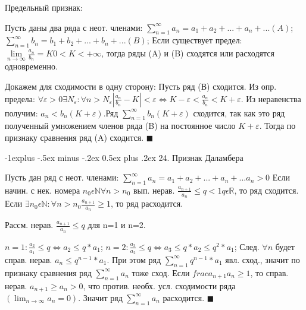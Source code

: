 \documentclass[unicode,10pt, landscape]{article}
\makeatletter
\renewcommand{\subsection}{\@startsection{subsection}{2}{0mm}%
                                {-1explus -.5ex minus -.2ex}%
                                {0.5ex plus .2ex}%
                                {\normalfont\normalsize\bfseries}}
\newenvironment{Proof} %
{\par\noindent{\bf Док-во:}} %
{\hfill$\scriptstyle\blacksquare$}
\makeatother
\begin{document}
\begin{multicols}{4}
Предельный признак:
\begin{Th}
Пусть даны два ряда с неот. членами: $\sum\limits_{n=1}^{\infty} a_{n}=a_{1}+a_{2}+...+a_{n}+...    (A)$; $\sum\limits_{n=1}^{\infty} b_{n}=b_{1}+b_{2}+...+b_{n}+...    (B)$; Если существует предел: $\lim\limits_{n\rightarrow \infty } \frac{a_{n}}{b_{n}}=K      0<K< +\infty$, тогда ряды (A) и (B) сходятся или расходятся одновременно.
\begin{Proof}
Докажем для сходимости в одну сторону:
Пусть ряд (В) сходится. Из опр. предела: $\forall \varepsilon >0 \exists N_{\varepsilon }:\forall n>N_{\varepsilon }\left | \frac{a_{n}}{b_{n}}-K \right |<\varepsilon \Leftrightarrow K-\varepsilon <\frac{a_{n}}{b_{n}}<K+\varepsilon$. Из неравенства получим: $a_{n}<b_{n}(K+\varepsilon )$.Ряд $\sum_{n=1}^{\infty} b_{n}(K+\varepsilon )$ сходится, так как это ряд полученный умножением членов ряда (B) на постоянное число $K+\varepsilon$. Тогда по признаку сравнения ряд (A) сходится.
\end{Proof}
\end{Th}


\subsection{24. Признак Даламбера}
\begin{Th}
Пусть дан ряд с неот. членами:
$\sum\limits_{n=1}^{\infty} a_{n}=a_{1}+a_{2}+...+a_{n}+...
a_{n}>0$
Если начин. с нек. номера $n_{0}\epsilon \mathbb{N} \forall n>n_{0}$ вып. нерав. $\frac{a_{n+1}}{a_{n}}\leq q<1 q\epsilon \mathbb{R}$, то ряд сходится.
Если $\exists n_{0}\epsilon \mathbb{N}:\forall n>n_{0} \frac{a_{n+1}}{a_{n}}\geq 1$, то ряд расходится.
\begin{Proof}
Рассм. нерав. $\frac{a_{n+1}}{a_{n}}\leq q$ для n=1 и n=2.

$n=1:\frac{a_{2}}{a_{1}}\leq q\Leftrightarrow a_{2}\leq q*a_{1}$;
$n=2:\frac{a_{3}}{a_{2}}\leq q\Leftrightarrow a_{3}\leq q*a_{2}\leq q^{2}*a_{1}$;
След. $\forall n$ будет справ. нерав. $a_{n}\leq q^{n-1}*a_{1}$. При этом ряд $\sum_{n=1}^{\infty} q^{n-1}*a_{1}$ явл. сход., значит по признаку сравнения ряд $\sum_{n=1}^{\infty} a_{n}$ тоже сход.
Если $frac{a_{n+1}}{a_{n}}\geq 1$, то справ. нерав. $a_{n+1}\geq a_{n}>0$, что против. необх. усл. сходимости ряда $(\lim_{n\rightarrow \infty }a_{n}=0)$. Значит ряд $\sum_{n=1}^{\infty} a_{n}$ расходится.
\end{Proof}
\end{Th}


\end{multicols}
\end{document}
